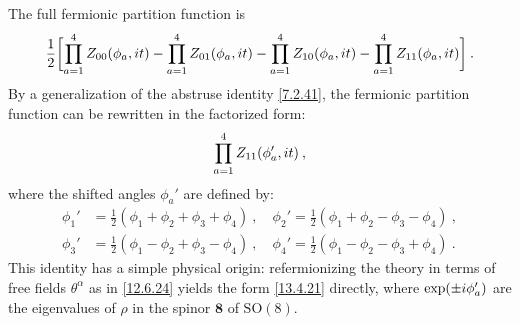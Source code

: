 The full fermionic partition function is
\begin{equation}
	\frac{1}{2}\biggl[\prod_{a=1}^4 Z_{00}(\phi_a, i t) - \prod_{a=1}^4 Z_{01}(\phi_a, i t) - \prod_{a=1}^4 Z_{10}(\phi_a, i t) - \prod_{a=1}^4 Z_{11}(\phi_a, i t)\biggr] \:. \label{13.4.20}
\end{equation}
By a generalization of the abstruse identity \eqref{7.2.41}, the fermionic partition function can be rewritten in the factorized form:
\begin{equation}
	\prod_{a=1}^4 Z_{11}(\phi_a', i t) \:, \label{13.4.21}
\end{equation}
where the shifted angles $\phi_a'$ are defined by:
\begin{subequations} \label{13.4.22}
	\begin{align}
		\phi_1' &= \frac{1}{2}(\phi_1 + \phi_2 + \phi_3 + \phi_4) \:, \quad \phi_2' = \frac{1}{2}(\phi_1 + \phi_2 - \phi_3 - \phi_4) \:, \label{13.4.22a} \\
		\phi_3' &= \frac{1}{2}(\phi_1 - \phi_2 + \phi_3 - \phi_4) \:, \quad \phi_4' = \frac{1}{2}(\phi_1 - \phi_2 - \phi_3 + \phi_4) \:. \label{13.4.22b}
	\end{align}
\end{subequations}
This identity has a simple physical origin: refermionizing the theory in terms of free fields $\theta^\alpha$ as in \eqref{12.6.24} yields the form \eqref{13.4.21} directly, where $\exp(\pm i\phi_a')$ are the eigenvalues of $\rho$ in the spinor $\mathbf{8}$ of $\mathrm{SO}(8)$.
